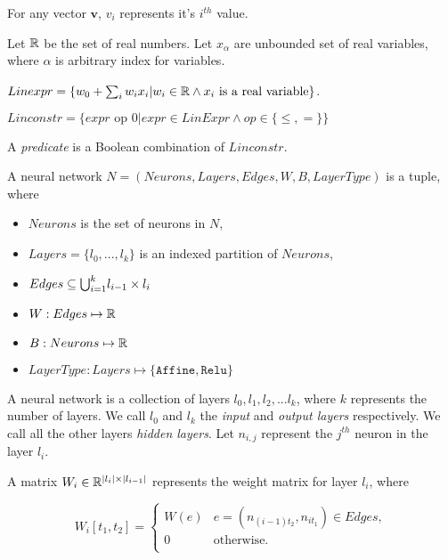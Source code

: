 For any vector $\boldsymbol{v}$, $v_i$ represents it's $i^{th}$ value.  

Let $\mathbb{R}$ be the set of real numbers.
Let $x_{\alpha}$ are unbounded set of real variables, where
$\alpha$ is arbitrary index for variables.

\begin{df}
    $Linexpr = \{ w_0 + \sum_{i} w_i x_i | w_i \in \mathbb{R} \land x_i \text{ is a real variable} \}$.
\end{df}
  
\begin{df}
    $Linconstr = \{expr \text{ op } 0 | expr \in LinExpr \land op \in \{\leq, = \}\}$
\end{df}

A {\em predicate} is a Boolean combination of $Linconstr$.

\begin{df}
    A neural network $N = (Neurons, Layers, Edges, W, B, LayerType)$ is a tuple, where
    \begin{itemize}
        \item $Neurons$ is the set of neurons in $N$,
        \item $Layers = \{l_0,...,l_k\}$ is an indexed partition of $Neurons$,
        \item $ Edges \subseteq {\bigcup}_{i=1}^{k} l_{i-1} \times l_{i}$
        \item $W : Edges \mapsto \mathbb{R}$
        \item $B : Neurons \mapsto \mathbb{R}$
        \item $LayerType : Layers \mapsto \{\mathtt{Affine}, \mathtt{Relu}\}$
    \end{itemize}
\end{df}

A neural network is a collection of layers $l_0, l_1, l_2, ... l_k$, where $k$ represents the number of layers.
We call $l_0$ and $l_k$ the {\em input} and {\em output layers} respectively.
We call all the other layers {\em hidden layers}.
Let $n_{i,j}$ represent the $j^{th}$ neuron in the layer $l_i$.
\begin{df}
  A matrix $W_i \in \mathbb{R}^{|l_i|\times|l_{i-1}|}$ represents the weight matrix for layer $l_i$, where
  
    $$
    W_i[t_1, t_2] = 
    \begin{cases}
      W(e) & e=(n_{(i-1)t_2}, n_{it_1}) \in Edges,\\
      0 & \text{otherwise.}\\
    \end{cases}
    $$
\end{df}

